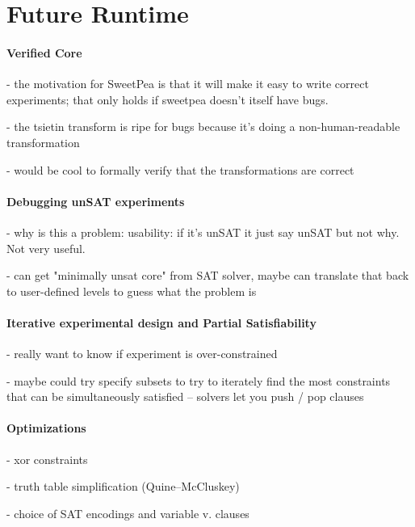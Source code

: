 

\section{Future Runtime}


\paragraph*{Verified Core}

- the motivation for SweetPea is that it will make it easy to write correct experiments; that only holds if sweetpea doesn't itself have bugs.

- the tsietin transform is ripe for bugs because it's doing a non-human-readable transformation

- would be cool to formally verify that the transformations are correct


\paragraph*{Debugging unSAT experiments}

- why is this a problem: usability: if it's unSAT it just say unSAT but not why. Not very useful.

- can get "minimally unsat core" from SAT solver, maybe can translate that back to user-defined levels to guess what the problem is

\paragraph*{Iterative experimental design and Partial Satisfiability}

- really want to know if experiment is over-constrained

- maybe could try specify subsets to try to iterately find the most constraints that can be simultaneously satisfied -- solvers let you push / pop clauses

\paragraph*{Optimizations}

- xor constraints

- truth table simplification (Quine–McCluskey)

- choice of SAT encodings and variable v. clauses
